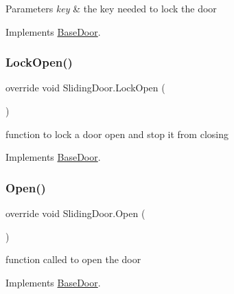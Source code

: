 \begin{DoxyParams}{Parameters}
{\em key} & the key needed to lock the door\\
\hline
\end{DoxyParams}


Implements \mbox{\hyperlink{class_base_door_a2b616c52626299f25ac25f7deab44dc4}{Base\+Door}}.

\mbox{\label{class_sliding_door_aca96469919dc50b5b3cc77cd6f4fc7d2}} 
\subsubsection{\texorpdfstring{Lock\+Open()}{LockOpen()}}
{\footnotesize\ttfamily override void Sliding\+Door.\+Lock\+Open (\begin{DoxyParamCaption}{ }\end{DoxyParamCaption})\hspace{0.3cm}{\ttfamily [virtual]}}



function to lock a door open and stop it from closing 



Implements \mbox{\hyperlink{class_base_door_a9a851525c3b6e878bec459992ac75408}{Base\+Door}}.

\mbox{\label{class_sliding_door_aaf090e96cc143eb5ed3eaf875045efc9}} 
\subsubsection{\texorpdfstring{Open()}{Open()}}
{\footnotesize\ttfamily override void Sliding\+Door.\+Open (\begin{DoxyParamCaption}{ }\end{DoxyParamCaption})\hspace{0.3cm}{\ttfamily [virtual]}}



function called to open the door 



Implements \mbox{\hyperlink{class_base_door_a418df6f73cc5c56b6989c0512a6a909b}{Base\+Door}}.

